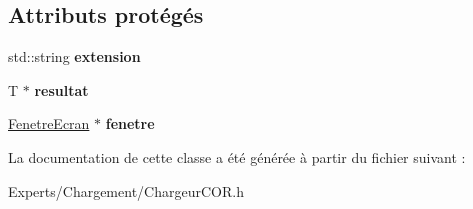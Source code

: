 \subsection*{Attributs protégés}
\begin{DoxyCompactItemize}
\item 
\mbox{\label{class_chargeur_c_o_r_afaa3c0de289a47967a6629683e489445}} 
std\+::string {\bfseries extension}
\item 
\mbox{\label{class_chargeur_c_o_r_a1b08edb06d1442b8f5a71152c5a49749}} 
T $\ast$ {\bfseries resultat}
\item 
\mbox{\label{class_chargeur_c_o_r_a92a282cee5e701a1bbbdfbcb16f31cc2}} 
\mbox{\hyperlink{class_fenetre_ecran}{Fenetre\+Ecran}} $\ast$ {\bfseries fenetre}
\end{DoxyCompactItemize}


La documentation de cette classe a été générée à partir du fichier suivant \+:\begin{DoxyCompactItemize}
\item 
Experts/\+Chargement/Chargeur\+C\+O\+R.\+h\end{DoxyCompactItemize}
